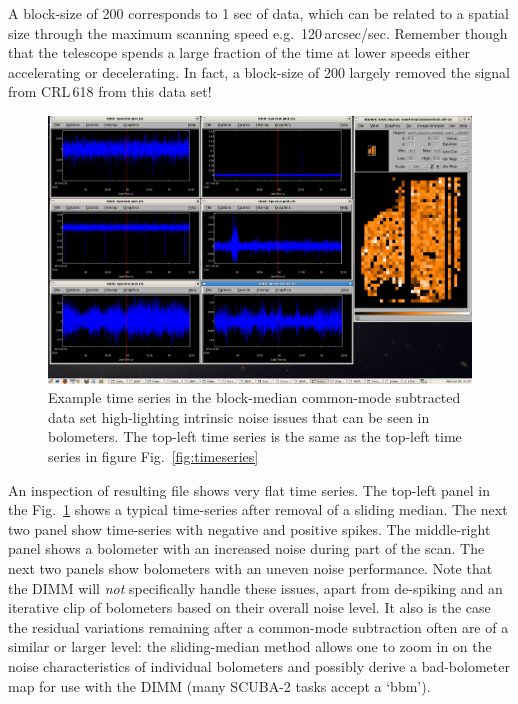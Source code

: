 \documentclass[twoside,11pt]{starlink}
\begin{document}
A block-size of 200 corresponds to 1 sec of data, which can be related
to a spatial size through the maximum scanning speed
e.g.\ 120\,arcsec/sec. Remember though that the telescope spends a large
fraction of the time at lower speeds either accelerating or
decelerating. In fact, a block-size of 200 largely removed the signal
from CRL\,618 from this data set!

\begin{figure}[ht]
\begin{center}
\includegraphics[width=1.0\linewidth]{sc19_timeseries2}
\caption{Example time series in the block-median common-mode
subtracted data set high-lighting intrinsic noise issues that can be
seen in bolometers. The top-left time series is the same as the
top-left time series in figure Fig.~\ref{fig:timeseries}}
\label{fig:timeseries2}
\end{center}
\end{figure}

An inspection of resulting file shows very flat time series. The
top-left panel in the Fig.~\ref{fig:timeseries2} shows a typical
time-series after removal of a sliding median. The next two panel show
time-series with negative and positive spikes. The middle-right panel
shows a bolometer with an increased noise during part of the scan. The
next two panels show bolometers with an uneven noise performance. Note
that the DIMM will \textsl{not} specifically handle these
issues, apart from de-spiking and an iterative clip of bolometers
based on their overall noise level.  It also is the case the residual
variations remaining after a common-mode subtraction often are of a
similar or larger level: the sliding-median method allows one to zoom
in on the noise characteristics of individual bolometers and possibly
derive a bad-bolometer map for use with the DIMM (many SCUBA-2
tasks accept a `bbm').
\end{document}

